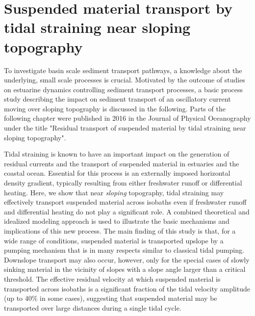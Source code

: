 \chapter{Suspended material transport by tidal straining
  near sloping topography}
\label{kap-slope}

To investigate basin scale sediment transport pathways, a knowledge 
about the underlying, small scale processes is crucial. Motivated by the 
outcome of studies on estuarine dynamics controlling sediment transport 
processes, a basic process study describing the impact on sediment transport of 
an oscillatory current moving over sloping topography is discussed in the 
following. Parts of the following chapter were published in 2016 in the Journal 
of Physical Oceanography under the title "Residual transport of suspended 
material by tidal straining near sloping topography".

Tidal straining is known to have an important impact on the
  generation of residual currents and the transport of suspended
  material in estuaries and the coastal ocean. Essential for this
  process is an externally imposed horizontal density gradient,
  typically resulting from either freshwater runoff or differential
  heating. Here, we show that near \emph{sloping} topography, tidal
  straining may effectively transport suspended material across
  isobaths even if freshwater runoff and differential heating do not
  play a significant role. A combined theoretical and idealized
  modeling approach is used to illustrate the basic mechanisms and
  implications of this new process. The main finding of this study is
  that, for a wide range of conditions, suspended material is
  transported upslope by a pumping mechanism that is in many respects
  similar to classical tidal pumping. Downslope transport may also
  occur, however, only for the special cases of slowly sinking
  material in the vicinity of slopes with a slope angle larger than a
  critical threshold. The effective residual velocity at which
  suspended material is transported across isobaths is a significant
  fraction of the tidal velocity amplitude (up to 40\% in some cases),
  suggesting that suspended material may be transported over large
  distances during a single tidal cycle. \citep{schulzumlauf2016}

